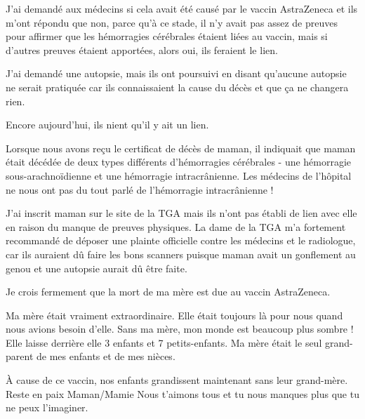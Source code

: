 {J'ai demandé aux médecins si cela avait été causé par le vaccin AstraZeneca et
ils m'ont répondu que non, parce qu'à ce stade, il n'y avait pas assez de
preuves pour affirmer que les hémorragies cérébrales étaient liées au vaccin,
mais si d'autres preuves étaient apportées, alors oui, ils feraient le lien.

J'ai demandé une autopsie, mais ils ont poursuivi en disant qu'aucune autopsie
ne serait pratiquée car ils connaissaient la cause du décès et que ça ne
changera rien.

Encore aujourd'hui, ils nient qu'il y ait un lien.

Lorsque nous avons reçu le certificat de décès de maman, il indiquait que maman
était décédée de deux types différents d'hémorragies cérébrales - une hémorragie
sous-arachnoïdienne et une hémorragie intracrânienne. Les médecins de l'hôpital
ne nous ont pas du tout parlé de l'hémorragie intracrânienne !

J'ai inscrit maman sur le site de la TGA mais ils n'ont pas établi de lien avec
elle en raison du manque de preuves physiques. La dame de la TGA m'a fortement
recommandé de déposer une plainte officielle contre les médecins et le
radiologue, car ils auraient dû faire les bons scanners puisque maman avait un
gonflement au genou et une autopsie aurait dû être faite.

Je crois fermement que la mort de ma mère est due au vaccin AstraZeneca.

Ma mère était vraiment extraordinaire. Elle était toujours là pour nous quand
nous avions besoin d'elle. Sans ma mère, mon monde est beaucoup plus sombre !
Elle laisse derrière elle 3 enfants et 7 petits-enfants. Ma mère était le seul
grand-parent de mes enfants et de mes nièces.

À cause de ce vaccin, nos enfants grandissent maintenant sans leur
grand-mère. Reste en paix Maman/Mamie Nous t'aimons tous et tu nous manques plus
que tu ne peux l'imaginer.

}
